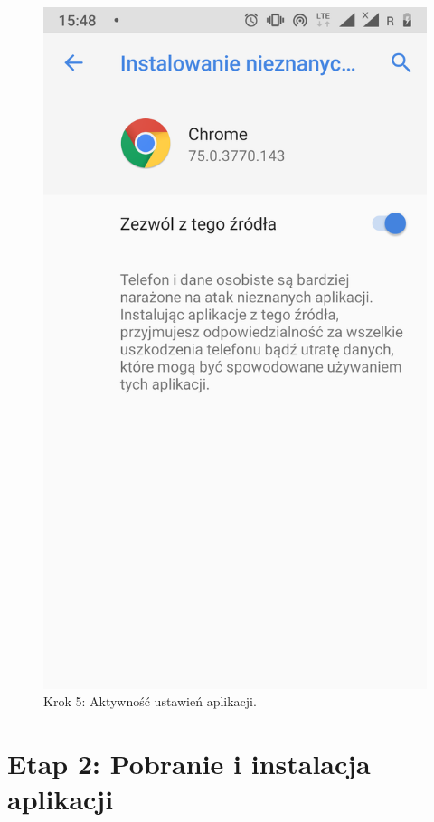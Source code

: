 \begin{enumerate}
	\begin{figure}[H]
		\centering
		\includegraphics[scale=0.13]{dodatekA/1_5.png}
		\caption{Krok 5: Aktywność ustawień aplikacji.}
	\end{figure}
	
\end{enumerate}


\section{Etap 2: Pobranie i instalacja aplikacji}
\label{sec:pobranieIInstalacjaAplikacji}

